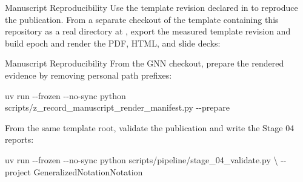 \documentclass[
  ignorenonframetext,
]{beamer}
\newenvironment{Shaded}{}{}
\newcommand{\AttributeTok}[1]{\textcolor[rgb]{0.49,0.56,0.16}{#1}}
\newcommand{\BuiltInTok}[1]{\textcolor[rgb]{0.00,0.50,0.00}{#1}}
\newcommand{\DataTypeTok}[1]{\textcolor[rgb]{0.56,0.13,0.00}{#1}}
\newcommand{\ExtensionTok}[1]{#1}
\newcommand{\FunctionTok}[1]{\textcolor[rgb]{0.02,0.16,0.49}{#1}}
\newcommand{\NormalTok}[1]{#1}
\newcommand{\OperatorTok}[1]{\textcolor[rgb]{0.40,0.40,0.40}{#1}}
\newcommand{\StringTok}[1]{\textcolor[rgb]{0.25,0.44,0.63}{#1}}
\newcommand{\VariableTok}[1]{\textcolor[rgb]{0.10,0.09,0.49}{#1}}
\begin{document}
\begin{frame}{Manuscript Reproducibility}
Use the template revision declared in
 to reproduce the
publication. From a separate checkout of the template containing this
repository as a real directory at
, export the
measured template revision and build epoch and render the PDF, HTML, and
slide decks:

\begin{Shaded}
\end{Shaded}

\end{frame}

\begin{frame}{Manuscript Reproducibility}
From the GNN checkout, prepare the rendered evidence by removing
personal path prefixes:

\begin{Shaded}
\begin{Highlighting}[]
\ExtensionTok{uv}\NormalTok{ run }\AttributeTok{{-}{-}frozen} \AttributeTok{{-}{-}no{-}sync}\NormalTok{ python scripts/z\_record\_manuscript\_render\_manifest.py }\AttributeTok{{-}{-}prepare}
\end{Highlighting}
\end{Shaded}

From the same template root, validate the publication and write the
Stage 04 reports:

\begin{Shaded}
\begin{Highlighting}[]
\ExtensionTok{uv}\NormalTok{ run }\AttributeTok{{-}{-}frozen} \AttributeTok{{-}{-}no{-}sync}\NormalTok{ python scripts/pipeline/stage\_04\_validate.py }\DataTypeTok{\textbackslash{}}
  \AttributeTok{{-}{-}project}\NormalTok{ GeneralizedNotationNotation}
\end{Highlighting}
\end{Shaded}

\end{frame}
\end{document}
